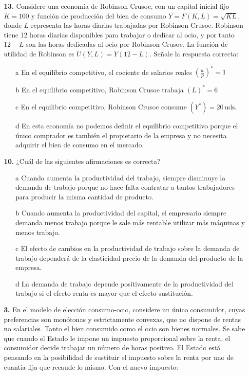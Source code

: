 \documentclass{nuevotema}
\begin{document}
\preguntas


\textbf{13.} Considere una economía de Robinson Crusoe, con un capital inicial fijo $K=100$ y función de producción del bien de consumo $Y=F(K,L) = \sqrt{KL}$, donde $L$ representa las horas diarias trabajadas por Robinson Crusoe. Robinson tiene 12 horas diarias disponibles para trabajar o dedicar al ocio, y por tanto $12 -L$ son las horas dedicadas al ocio por Robinson Crusoe. La función de utilidad de Robinson es $U(Y,L) = Y(12 -L)$. Señale la respuesta correcta:

\begin{itemize}
	\item[a] En el equilibrio competitivo, el cociente de salarios reales $\left( \frac{w}{p} \right)^* = 1$
	\item[b] En el equilibrio competitivo, Robinson Crusoe trabaja $(L)^* = 6$
	\item[c] En el equilibrio competitivo, Robinson Crusoe consume $(Y^*) = 20 \, \text{uds}$.
	\item[d] En esta economía no podemos definir el equilibrio competitivo porque el único comprador es también el propietario de la empresa y no necesita adquirir el bien de consumo en el mercado.
\end{itemize}


\textbf{10.} ¿Cuál de las siguientes afirmaciones es correcta?

\begin{itemize}
	\item[a] Cuando aumenta la productividad del trabajo, siempre disminuye la demanda de trabajo porque no hace falta contratar a tantos trabajadores para producir la misma cantidad de producto.
	\item[b] Cuando aumenta la productividad del capital, el empresario siempre demanda menos trabajo porque le sale más rentable utilizar más máquinas y menos trabajo.
	\item[c] El efecto de cambios en la productividad de trabajo sobre la demanda de trabajo dependerá de la elasticidad-precio de la demanda del producto de la empresa.
	\item[d] La demanda de trabajo depende positivamente de la productividad del trabajo si el efecto renta es mayor que el efecto sustitución.
\end{itemize}


\textbf{3.} En el modelo de elección consumo-ocio, considere un único consumidor, cuyas preferencias son monótonas y estrictamente convexas, que no dispone de rentas no salariales. Tanto el bien consumido como el ocio son bienes normales. Se sabe que cuando el Estado le impone un impuesto proporcional sobre la renta, el consumidor decide trabajar un número de horas positivo. El Estado está pensando en la posibilidad de sustituir el impuesto sobre la renta por uno de cuantía fija que recaude lo mismo. Con el nuevo impuesto:
\end{document}
